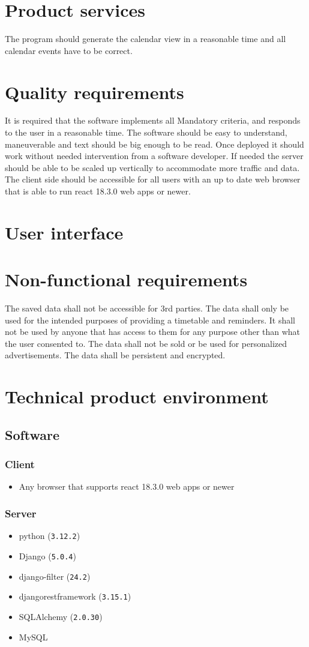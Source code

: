 \documentclass[]{article}
\begin{document}
\section{Product services}
	The program should generate the calendar view in a reasonable time and all calendar events have to be correct.
\section{Quality requirements}
	It is required that the software implements all Mandatory criteria, and responds to the user in a reasonable time. The software should be easy to understand, maneuverable and text should be big enough to be read. Once deployed it should work without needed intervention from a software developer. If needed the server should be able to be scaled up vertically to accommodate more traffic and data. The client side should be accessible for all users with an up to date web browser that is able to run react 18.3.0 web apps or newer.
\section{User interface}
\section{Non-functional requirements}
	The saved data shall not be accessible for 3rd parties. The data shall only be used for the intended purposes of providing a timetable and reminders. It shall not be used by anyone that has access to them for any purpose other than what the user consented to. The data shall not be sold or be used for personalized advertisements. The data shall be persistent and encrypted.
\section{Technical product environment}
	\subsection{Software}
		\subsubsection{Client}
			\begin{itemize}
				\item Any browser that supports react 18.3.0 web apps or newer
			\end{itemize}
		\subsubsection{Server}
			\begin{itemize}
				\item python (\texttt{3.12.2})
				\item Django (\texttt{5.0.4})
				\item django-filter (\texttt{24.2})
				\item djangorestframework (\texttt{3.15.1})
				\item SQLAlchemy (\texttt{2.0.30})
				\item MySQL
			\end{itemize}
\end{document}
